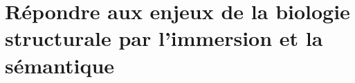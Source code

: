\chapter[Répondre aux enjeux de la biologie structurale par l'immersion et la sémantique]{Répondre aux enjeux de la biologie structurale par l'immersion et la sémantique}
\label{Sec:visuAna}
\minitoc
\cleardoublepage






